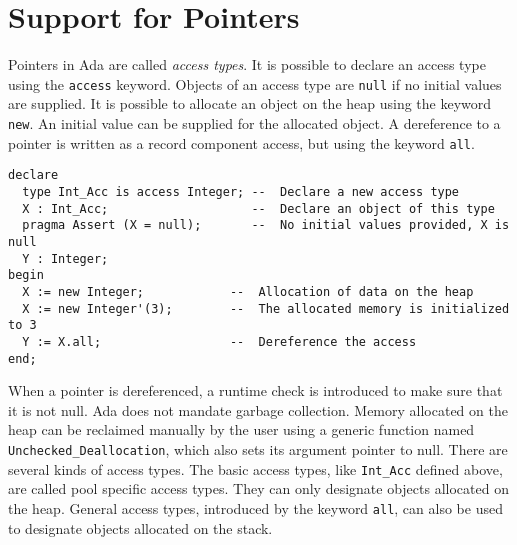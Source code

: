 \documentclass[runningheads]{llncs}
\begin{document}
\section{Support for Pointers\label{sec-pointers}}
Pointers in Ada are called \emph{access types}. It is possible to declare an access type using the \texttt{access} keyword.
Objects of an access type are \texttt{null} if no initial values are supplied.
It is possible to allocate an object on the heap using the keyword \texttt{new}. An initial value can be supplied for the allocated object.
A dereference to a pointer is written as a record component access, but using the keyword \texttt{all}.
\begin{lstlisting}
declare
  type Int_Acc is access Integer; --  Declare a new access type
  X : Int_Acc;                    --  Declare an object of this type
  pragma Assert (X = null);       --  No initial values provided, X is null
  Y : Integer;
begin
  X := new Integer;            --  Allocation of data on the heap
  X := new Integer'(3);        --  The allocated memory is initialized to 3
  Y := X.all;                  --  Dereference the access
end;
\end{lstlisting}
When a pointer is dereferenced, a runtime check is introduced to make sure that it is not null.
Ada does not mandate garbage collection. Memory allocated on the heap can be reclaimed manually by the user using a generic function named \texttt{Unchecked\_Deallocation}, which also sets its argument pointer to null.
There are several kinds of access types. The basic access types, like \texttt{Int\_Acc} defined above, are called pool specific access types. They can only designate objects allocated on the heap. General access types, introduced by the keyword \texttt{all}, can also be used to designate objects allocated on the stack.
\end{document}

